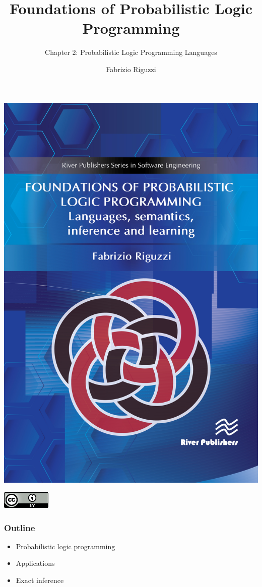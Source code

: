 \documentclass[trans]{beamer}
\title[PLP - Ch 2 - CC BY 4.0]
{Foundations of Probabilistic Logic Programming}
\subtitle{Chapter 2: Probabilistic Logic Programming Languages}
\author[F. Riguzzi] %
{Fabrizio Riguzzi}
\institute[] %
{
}
\date{}
\begin{document}
\begin{frame}
\titlepage
\vspace{-2cm}
\begin{center}
\includegraphics[scale=0.120]{plp-book.jpg}

\includegraphics[scale=0.3]{cc-by.png}

\end{center}
\end{frame}



\begin{frame}
  \frametitle{Outline}
\begin{itemize}
\item Probabilistic logic programming
\item Applications
\item Exact inference
\end{itemize}
\end{frame}
\end{document}
